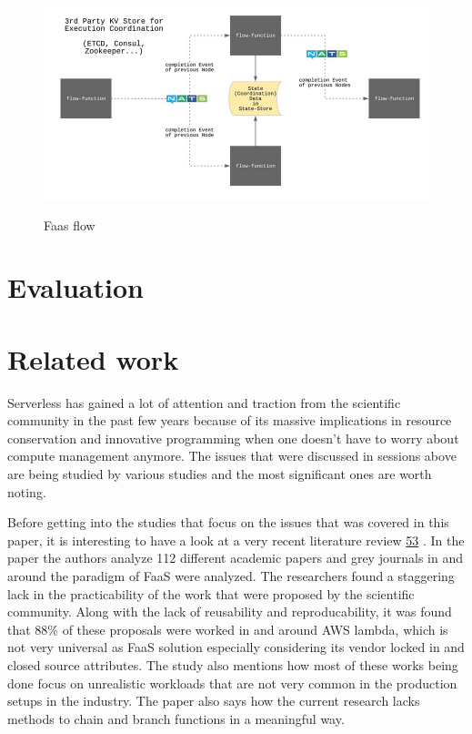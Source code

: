 \documentclass[12pt,titlepage]{article}
\begin{document}
\begin{figure}[!h]
    \caption{Faas flow}
    \centering
    \includegraphics[width=130mm]{./thesis_images/faas-flow.png}
    \label{fig:faas-flow}
\end{figure}
\section{Evaluation}
\label{sec:org0a676c0}
\section{Related work}
\label{sec:org388786d}
Serverless has gained a lot of attention and traction from the scientific
community in the past few years because of its massive implications in resource
conservation and innovative programming when one doesn't have to worry about
compute management anymore. The issues that were discussed in sessions above are
being studied by various studies and the most significant ones are worth noting.

Before getting into the studies that focus on the issues that was covered in
this paper, it is interesting to have a look at  a very recent literature review \hyperref[ref:53]{53}
. In the paper the authors analyze 112 different academic papers
and grey journals in
and around the paradigm of FaaS were analyzed. The researchers found a
staggering lack in the practicability of the work that were proposed by the
scientific community. Along with the lack of reusability and reproducability, it
was found that 88\% of these proposals were worked in and around AWS lambda,
which is not very universal as FaaS solution especially considering its vendor
locked in and closed source attributes. The study also mentions how most of
these works being done focus on unrealistic workloads that are not very common
in the production setups in the industry. The paper also says how the current
research lacks methods to chain and branch functions in a meaningful way.
\end{document}
